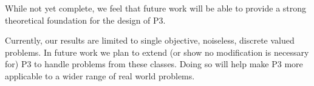 \documentclass{sig-alternate}
\begin{document}
While not yet complete, we feel that future work will be able to provide a strong
theoretical foundation for the design of P3.
\begin{comment}
Here we have presented outlines
for a number of expected runtime proofs, some of which apply to complex problems.
Again, it is P3's mix of strongly elitist selection, paired with continuous integration
of random information that allows for this analysis which cannot be done for many
other state of the art techniques, such as LTGA.
\end{comment}

Currently, our results are limited to single objective, noiseless, discrete valued problems.
In future work we plan to extend (or show no modification is necessary for) P3 to handle
problems from these classes.  Doing so will help make P3 more applicable to a wider
range of real world problems.

\begin{comment}
Finally, as future work we plan to investigate the individual pieces of P3 for
their usefulness.  While intuitively many of them fit together well, it is possible
that slight modification will allow for even better synergy.  Conversely, the population
pyramid scheme itself may combine well with other optimization techniques.
\end{comment}

%

%
%
\balancecolumns
\end{document}
